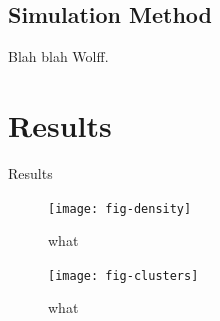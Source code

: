 \documentclass[aps,prl,reprint,groupedaddress]{revtex4-1}
\begin{document}
\subsection{Simulation Method}

Blah blah Wolff. 


\section{Results\label{sec-results}}

Results

\begin{figure}
\texttt{[image: fig-density]}
\caption{\label{fig-density} what}
\end{figure}

\begin{figure}
\texttt{[image: fig-clusters]}
\caption{\label{fig-clusters} what}
\end{figure}



%


\end{document}
